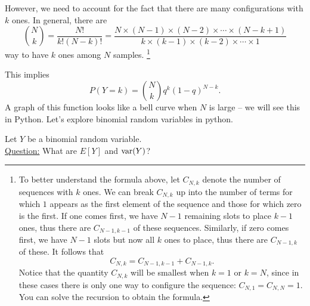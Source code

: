 \begin{itemize}
 \noindent
However, we need to account for the fact that there are many configurations with $k$ ones. In general, there are 
\begin{equation*}
{N \choose k} = \frac{N!}{k!(N-k)!} = \frac{N \times (N-1) \times (N-2) \times \cdots \times (N-k+1)}{k \times (k-1) \times (k-2) \times \cdots \times 1}
\end{equation*}
way to have $k$ ones among $N$ samples. 
\footnote{To better understand the formula above, let $C_{N,k}$ denote the number of sequences with $k$ ones. We can break $C_{N,k}$ up into the number of terms for which $1$ appears as the first element of the sequence and those for which zero is the first. If one comes first, we have $N-1$ remaining slots to place $k-1$ ones, thus there are $C_{N-1,k-1}$ of these sequences. Similarly, if zero comes first, we have $N-1$ slots but now all $k$ ones to place, thus there are $C_{N-1,k}$ of these. It follows that 
\begin{equation*}
C_{N,k} = C_{N-1,k-1} + C_{N-1,k}. 
\end{equation*}
Notice that the quantity $C_{N,k}$ will be smallest when $k=1$ or $k=N$, since in these cases there is only one way to configure the sequence: $C_{N,1} = C_{N,N} = 1$.  You can solve the recursion to obtain the formula. }
%

This implies 
\begin{equation*}
P(Y=k)=  {N \choose k}q^{k}(1-q)^{N-k}. 
\end{equation*}
A graph of this function looks like a bell curve when $N$ is large -- we will see this in Python. Let's explore binomial random variables in python.  


%
 
\begin{example}\label{ex:binomial_stats}
Let $Y$ be a binomial random variable. \\
 
 \noindent
\underline{Question:} What are $E[Y]$ and ${\rm var}(Y)$?\\
 

\end{example}
\end{itemize}
